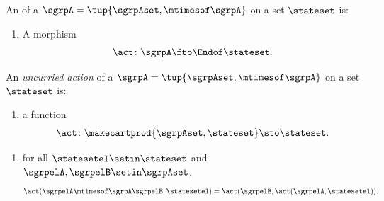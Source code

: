 \begin{ctdefinition}
    \label{def:semigroup-cov-action}
    An  of a  $\sgrpA = \tup{\sgrpAset, \mtimesof\sgrpA}$ on a set $\stateset$ is:

    \constit
    \begin{enumerate}
        \item A  morphism
              \begin{equation}
                  \label{eq:act-semigroup}
                  \act \colon \sgrpA \fto \Endof\stateset.
              \end{equation}
    \end{enumerate}
\end{ctdefinition}

\begin{ctdefinition}
    \label{def:semigroup-uncurried-action}
    An \emph{uncurried action} of a  $\sgrpA = \tup{\sgrpAset, \mtimesof\sgrpA}$ on a set $\stateset$ is:

    \constit
    \begin{enumerate}
        \item a function
              \begin{equation}
                  \label{eq:semigroup-uncurried-action}
                  \act \colon \makecartprod{\sgrpAset, \stateset} \sto \stateset.
              \end{equation}
    \end{enumerate}
    \condit
    \begin{enumerate}
        \item for all $\statesetel \setin \stateset$ and $\sgrpelA, \sgrpelB \setin \sgrpAset$,
              \begin{equation}
                  \label{eq:semigroup-uncurried-action-1cond}
                  \act(\sgrpelA \mtimesof\sgrpA \sgrpelB, \statesetel) = \act(\sgrpelB, \act(\sgrpelA, \statesetel)).
              \end{equation}
    \end{enumerate}
\end{ctdefinition}



